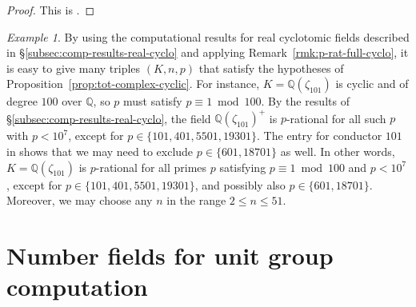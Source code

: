 \documentclass[12pt, a4paper, usenames]{amsart}
\newcommand{\Q}{\mathbb{Q}}
\theoremstyle{plain}
\theoremstyle{remark}
\newtheorem{example}[theorem]{Example}
\theoremstyle{definition}
\begin{document}
\begin{proof}
This is \cite[Proposition~6.6]{MR3512524}.    
\end{proof}

\begin{example}\label{ex:cyclic-p-rat}
By using the computational results for real cyclotomic fields 
described in \S \ref{subsec:comp-results-real-cyclo} 
and applying Remark~\ref{rmk:p-rat-full-cyclo}, 
it is easy to give many triples $(K,n,p)$ that satisfy the hypotheses of
Proposition~\ref{prop:tot-complex-cyclic}.
For instance, $K=\Q(\zeta_{101})$ is cyclic and of degree $100$ over $\Q$, 
so $p$ must satisfy $p \equiv 1 \bmod{100}$.
By the results of \S \ref{subsec:comp-results-real-cyclo}, the
field $\Q(\zeta_{101})^{+}$ is $p$-rational for all such $p$ with $p<10^{7}$, except
for $p \in \{ 101, 401, 5501, 19301\}$.
The entry for conductor $101$ in \cite[Tables, \S 3]{MR1421575} shows that
we may need to exclude $p \in \{ 601, 18701 \}$ as well.
In other words, $K=\Q(\zeta_{101})$ is $p$-rational for all primes
$p$ satisfying $p \equiv 1 \bmod{100}$ and $p <10^{7}$, except for 
$p \in \{ 101, 401, 5501, 19301\}$, and possibly also $p \in \{ 601, 18701 \}$.
Moreover, we may choose any $n$ in the range $2 \leq n \leq 51$. 
\end{example}

\appendix

\section{Number fields for unit group computation}\label{appendix:number-fields}
\end{document}
